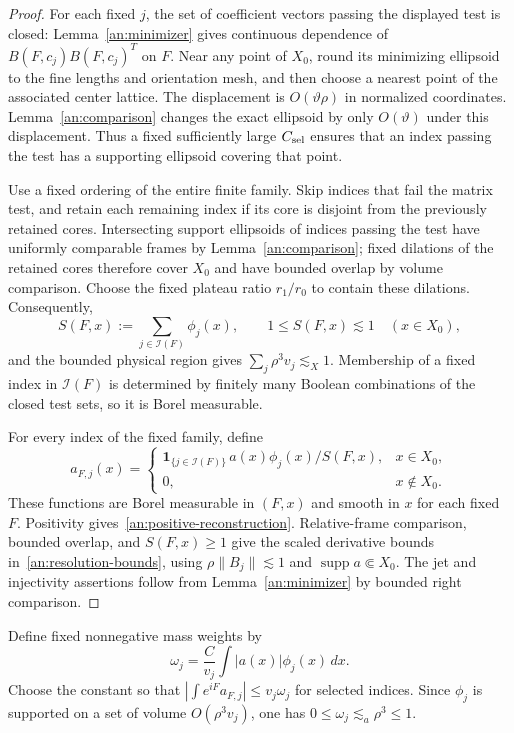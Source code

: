 \documentclass[11pt]{amsart}
\theoremstyle{definition}
\theoremstyle{remark}
\numberwithin{equation}{section}
\begin{document}
\begin{proof}
For each fixed $j$, the set of coefficient vectors passing the displayed test is closed: Lemma~\ref{an:minimizer} gives continuous dependence of $B(F,c_j)B(F,c_j)^T$ on $F$. Near any point of $X_0$, round its minimizing ellipsoid to the fine lengths and orientation mesh, and then choose a nearest point of the associated center lattice. The displacement is $O(\vartheta\rho)$ in normalized coordinates. Lemma~\ref{an:comparison} changes the exact ellipsoid by only $O(\vartheta)$ under this displacement. Thus a fixed sufficiently large $C_{\rm sel}$ ensures that an index passing the test has a supporting ellipsoid covering that point.

Use a fixed ordering of the entire finite family. Skip indices that fail the matrix test, and retain each remaining index if its core is disjoint from the previously retained cores. Intersecting support ellipsoids of indices passing the test have uniformly comparable frames by Lemma~\ref{an:comparison}; fixed dilations of the retained cores therefore cover $X_0$ and have bounded overlap by volume comparison. Choose the fixed plateau ratio $r_1/r_0$ to contain these dilations. Consequently,
\[
S(F,x):=\sum_{j\in\mathcal I(F)}\phi_j(x),\qquad 1\le S(F,x)\lesssim1\quad(x\in X_0),
\]
and the bounded physical region gives $\sum_j\rho^3v_j\lesssim_X1$. Membership of a fixed index in $\mathcal I(F)$ is determined by finitely many Boolean combinations of the closed test sets, so it is Borel measurable.

For every index of the fixed family, define
\[
a_{F,j}(x)=
\begin{cases}
\mathbf1_{\{j\in\mathcal I(F)\}}\,a(x)\phi_j(x)/S(F,x),&x\in X_0,\\
0,&x\notin X_0.
\end{cases}
\]
These functions are Borel measurable in $(F,x)$ and smooth in $x$ for each fixed $F$. Positivity gives~\eqref{an:positive-reconstruction}. Relative-frame comparison, bounded overlap, and $S(F,x)\ge1$ give the scaled derivative bounds in~\eqref{an:resolution-bounds}, using $\rho\|B_j\|\lesssim1$ and $\operatorname{supp}a\Subset X_0$. The jet and injectivity assertions follow from Lemma~\ref{an:minimizer} by bounded right comparison.
\end{proof}

Define fixed nonnegative mass weights by
\begin{equation}\label{an:mass-weights}
\omega_j=\frac{C}{v_j}\int|a(x)|\phi_j(x)\,dx.
\end{equation}
Choose the constant so that $|\int e^{iF}a_{F,j}|\le v_j\omega_j$ for selected indices. Since $\phi_j$ is supported on a set of volume $O(\rho^3v_j)$, one has $0\le\omega_j\lesssim_a\rho^3\le1$.
\end{document}
